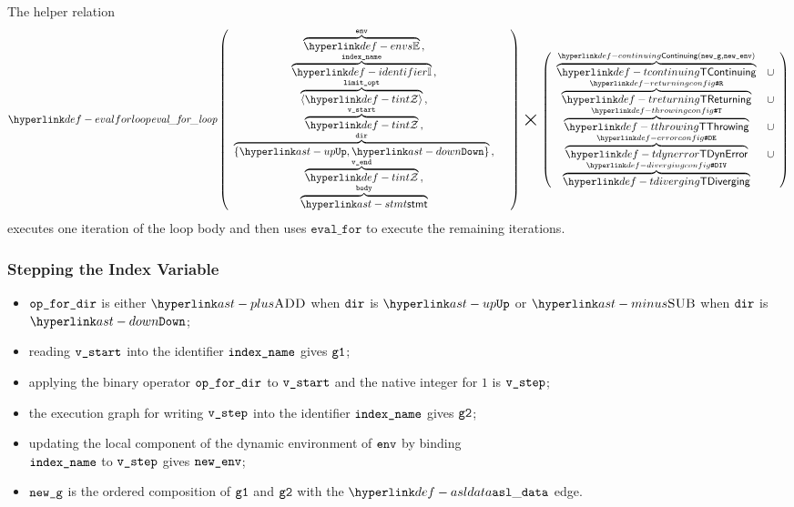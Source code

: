 \hypertarget{def-evalforloop}{}
The helper relation
\[
  \evalforloop\left(
    \begin{array}{cl}
    \overname{\envs}{\env} \aslsep &\\
    \overname{\Identifiers}{\vindexname} \aslsep &\\
    \overname{\langle\tint\rangle}{\vlimitopt} \aslsep &\\
    \overname{\tint}{\vstart} \aslsep &\\
    \overname{\{\UP,\DOWN\}}{\dir} \aslsep &\\
    \overname{\tint}{\vend} \aslsep &\\
    \overname{\stmt}{\vbody} &
    \end{array}
    \right) \;\aslrel\;
    \left(
    \begin{array}{cl}
    \overname{\TContinuing}{\Continuing(\newg, \newenv)} & \cup\\
    \overname{\TReturning}{\ReturningConfig} & \cup\\
    \overname{\TThrowing}{\ThrowingConfig} & \cup \\
    \overname{\TDynError}{\DynErrorConfig} & \cup\\
    \overname{\TDiverging}{\DivergingConfig} &
    \end{array}
    \right)
\]
executes one iteration of the loop body and then uses $\texttt{eval\_for}$ to execute the remaining
iterations.

\ProseParagraph
\subsubsection{Stepping the Index Variable}
\AllApply
\begin{itemize}
  \item $\texttt{op\_for\_dir}$ is either $\PLUS$ when $\texttt{dir}$ is $\UP$ or $\MINUS$ when $\texttt{dir}$ is $\DOWN$;
  \item reading $\texttt{v\_start}$ into the identifier $\texttt{index\_name}$ gives $\texttt{g1}$;
  \item applying the binary operator $\texttt{op\_for\_dir}$ to $\texttt{v\_start}$ and the native integer for $1$ is $\texttt{v\_step}$;
  \item the execution graph for writing $\texttt{v\_step}$ into the identifier $\texttt{index\_name}$ gives $\texttt{g2}$;
  \item updating the local component of the dynamic environment of $\texttt{env}$ by binding \\ $\texttt{index\_name}$ to $\texttt{v\_step}$
  gives $\texttt{new\_env}$;
  \item $\texttt{new\_g}$ is the ordered composition of $\texttt{g1}$ and $\texttt{g2}$ with the $\asldata$ edge.
\end{itemize}

